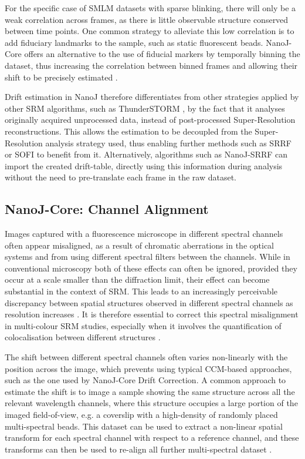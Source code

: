  For the specific case of SMLM datasets with sparse blinking, there will only be a weak correlation across frames, as there is little observable structure conserved between time points. One common strategy to alleviate this low correlation is to add fiduciary landmarks to the sample, such as static fluorescent beads. NanoJ-Core offers an alternative to the use of fiducial markers by temporally binning the dataset, thus increasing the correlation between binned frames and allowing their shift to be precisely estimated \cite{mlodzianoski2011sample}. 

 Drift estimation in NanoJ therefore differentiates from other strategies applied by other SRM algorithms, such as ThunderSTORM \cite{ovesny2014thunderstorm}, by the fact that it analyses originally acquired unprocessed data, instead of post-processed Super-Resolution reconstructions. This allows the estimation to be decoupled from the Super-Resolution analysis strategy used, thus enabling further methods such as SRRF or SOFI \cite{dertinger2009fast} to benefit from it. Alternatively, algorithms such as NanoJ-SRRF can import the created drift-table, directly using this information during analysis without the need to pre-translate each frame in the raw dataset.

\subsection*{NanoJ-Core: Channel Alignment}

 Images captured with a fluorescence microscope in different spectral channels often appear misaligned, as a result of chromatic aberrations in the optical systems and from using different spectral filters between the channels. While in conventional microscopy both of these effects can often be ignored, provided they occur at a scale smaller than the diffraction limit, their effect can become substantial in the context of SRM. This leads to an increasingly perceivable discrepancy between spatial structures observed in different spectral channels as resolution increases \cite{erdelyi2013correcting}. It is therefore essential to correct this spectral misalignment in multi-colour SRM studies, especially when it involves the quantification of colocalisation between different structures \cite{bock2007two,van2009multicolor,niekamp2017high}. 
 
 The shift between different spectral channels often varies non-linearly with the position across the image, which prevents using typical CCM-based approaches, such as the one used by NanoJ-Core Drift Correction. A common approach to estimate the shift is to image a sample showing the same structure across all the relevant wavelength channels, where this structure occupies a large portion of the imaged field-of-view, e.g. a coverslip with a high-density of randomly placed multi-spectral beads. This dataset can be used to extract a non-linear spatial transform for each spectral channel with respect to a reference channel, and these transforms can then be used to re-align all further multi-spectral dataset \cite{arganda2006consistent,annibale2012identification}. 
 
